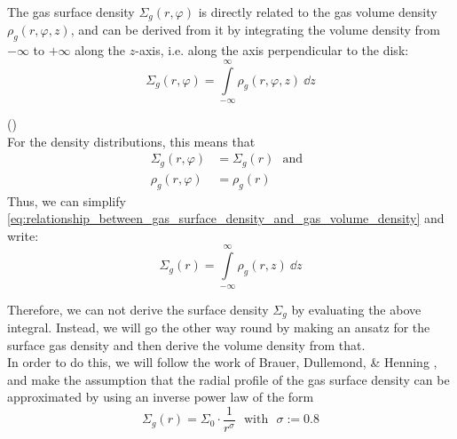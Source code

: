         The gas surface density $\Sigma_g(r,\varphi)$ is directly related to the gas volume density
        $\rho_g(r,\varphi,z)$, and can be derived from it by integrating the volume density from 
        $-\infty$ to $+\infty$ along the $z$-axis, i.e. along the axis perpendicular to the disk:
        \begin{equation}
            \label{eq:relationship_between_gas_surface_density_and_gas_volume_density}
            \Sigma_g(r,\varphi)
                = \int\limits_{-\infty}^{\infty} \rho_g(r,\varphi,z)\ \dd z
        \end{equation}

         () \\
        For the density distributions, this means that
        \begin{align}
            \Sigma_g(r, \varphi) 
                &= \Sigma_g(r) 
            \ \ \ \text{and}\ \ \
            \\
            \rho_g(r, \varphi) 
                &= \rho_g(r)
        \end{align}
        Thus, we can simplify 
        \cref{eq:relationship_between_gas_surface_density_and_gas_volume_density} and write:
        \begin{equation}
            \Sigma_g(r)
                = \int\limits_{-\infty}^{\infty} \rho_g(r,z)\ \dd z
        \end{equation}
        
        Therefore, we can not derive the surface density $\Sigma_g$ by evaluating the above
        integral. Instead, we will go the other way round by making an ansatz for the surface gas
        density and then derive the volume density from that. \\

        In order to do this, we will 
        follow the work of Brauer, Dullemond, \& Henning \cite{brauer_dullemond_henning_2007},
        and make the assumption that the radial profile of the gas surface density can be 
        approximated by using an inverse power law of the form
        \begin{equation}
            \label{eq:gas_surface_density_profile_inverse_power_law_ansatz}
            \Sigma_g(r)=\Sigma_0\cdot\frac{1}{r^\sigma}
            \ \ \ \text{with}\ \ \
            \sigma:=0.8
        \end{equation}

